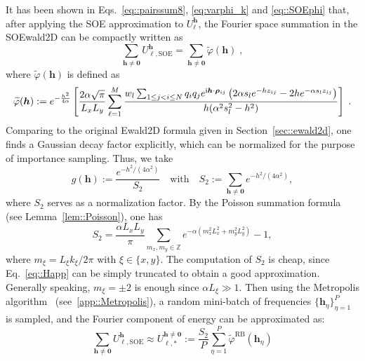 
It has been shown in Eqs.~\eqref{eq::pairssum8}, \eqref{eq:varphi_k} and \eqref{eq::SOEphi} that, after applying the SOE approximation to $U_{\ell}^{\bm{h}}$, the Fourier space summation in the SOEwald2D can be compactly written as
\begin{equation}
	\sum_{\bm{h}\neq\bm{0}} U_{\ell,\text{SOE}}^{\bm{h}} = \sum_{\bm{h}\neq\bm{0}} \widetilde{\varphi} (\bm{h})\;,
\end{equation}
where $\widetilde{\varphi} ({\bm{h}})$ is defined as
\begin{equation}
	\widetilde{\varphi} ({\bm{h}}) := e^{-\frac{h^2}{4 \alpha}} \left[ \frac{2\alpha\sqrt{\pi}}{L_xL_y}\sum_{\ell = 1}^{M}  \frac{w_l \sum_{1\leq j < i \leq N}q_{i} q_{j} e^{\mathrm{i}\boldsymbol{h} \cdot \boldsymbol{\rho}_{ij}} \left(2\alpha s_l e^{-h z_{ij}}-2h e^{-\alpha s_l z_{ij}}\right) }{h(\alpha^2 s_l^2 - h^2)} \right] \;.
\end{equation}
Comparing to the original Ewald2D formula given in Section~\ref{sec::ewald2d}, one finds a Gaussian decay factor explicitly, which can be normalized for the purpose of importance sampling.
Thus, we take
\begin{equation}\label{eq::hk}
	g(\bm{h}) := \frac{e^{-h^2/(4\alpha^2)}}{S_2}\quad\text{with}\quad S_2 := \sum_{\bm{h}\neq\bm{0}}e^{-h^2/(4\alpha^2)},
\end{equation}
where $S_2$ serves as a normalization factor. 
By the Poisson summation formula (see Lemma~\ref{lem::Poisson}), one has 
\begin{equation}\label{eq::Happ}
	S_2=\frac{\alpha L_xL_y}{\pi}\sum_{m_x,m_y\in\mathbb{Z}}e^{-\alpha(m_x^2L_x^2+m_y^2L_y^2)}-1,
\end{equation}
where $m_{\xi}=L_{\xi}k_{\xi}/2\pi$ with $\xi\in\{x,y\}$. 
The computation of $S_2$ is cheap, since Eq.~\eqref{eq::Happ} can be simply truncated to obtain a good approximation. 
Generally speaking, $m_{\xi}=\pm 2$ is enough since $\alpha L_{\xi}\gg 1$.
Then using the Metropolis algorithm~\cite{metropolis1953equation, hastings1970monte} (see~\ref{app::Metropolis}), a random mini-batch of frequencies $\{\bm{h}_{\eta}\}_{\eta=1}^P$ is sampled, and the Fourier component of energy can be approximated as:
\begin{equation}\label{eq::RBapp}
	\sum_{\bm{h}\neq\bm{0}} U_{\ell,\text{SOE}}^{\bm{h}} \approx U_{\ell,*}^{\bm{h}\neq\bm{0}} := \frac{S_2}{P}\sum_{\eta=1}^{P}\widetilde{\varphi}^{\text{RB}}(\bm{h}_{\eta})
\end{equation}
